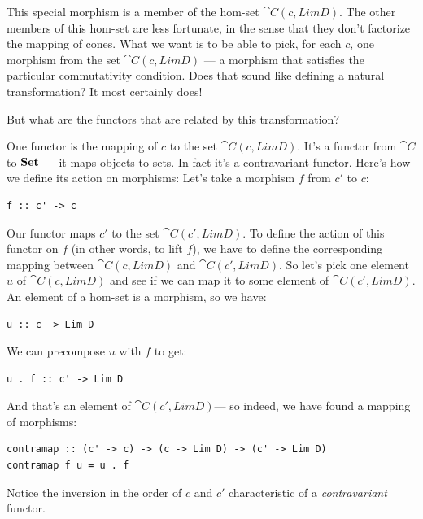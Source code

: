 This special morphism is a member of the hom-set $\cat{C}(c, LimD)$.
The other members of this hom-set are less fortunate, in the sense that
they don't factorize the mapping of cones. What we want is to be able to
pick, for each $c$, one morphism from the set
$\cat{C}(c, LimD)$ --- a morphism that satisfies the particular
commutativity condition. Does that sound like defining a natural
transformation? It most certainly does!

But what are the functors that are related by this transformation?

One functor is the mapping of $c$ to the set
$\cat{C}(c, Lim D)$. It's a functor from $\cat{C}$ to $\mathbf{Set}$ ---
it maps objects to sets. In fact it's a contravariant functor. Here's
how we define its action on morphisms: Let's take a morphism $f$
from $c'$ to $c$:

\begin{Verbatim}
f :: c' -> c
\end{Verbatim}

Our functor maps $c'$ to the set
$\cat{C}(c', Lim D)$. To define the action of this functor on
$f$ (in other words, to lift $f$), we have to define the
corresponding mapping between $\cat{C}(c, Lim D)$ and
$\cat{C}(c', Lim D)$. So let's pick one element $u$ of
$\cat{C}(c, Lim D)$ and see if we can map it to some element of
$\cat{C}(c', Lim D)$. An element of a hom-set is a morphism, so
we have:

\begin{Verbatim}
u :: c -> Lim D
\end{Verbatim}

We can precompose $u$ with $f$ to get:

\begin{Verbatim}
u . f :: c' -> Lim D
\end{Verbatim}

And that's an element of $\cat{C}(c', Lim D)$--- so indeed, we
have found a mapping of morphisms:

\begin{Verbatim}
contramap :: (c' -> c) -> (c -> Lim D) -> (c' -> Lim D) 
contramap f u = u . f
\end{Verbatim}

Notice the inversion in the order of $c$ and $c'$
characteristic of a \emph{contravariant} functor.

\begin{figure}[H]
\centering
{}
\end{figure}

